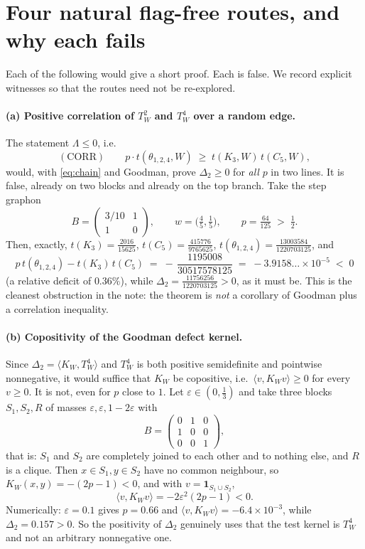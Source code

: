 \documentclass[11pt]{article}
\theoremstyle{definition}
\newcommand{\tw}{T_W}
\newcommand{\kw}{K_W}
\newcommand{\thet}{\theta_{1,2,4}}
\begin{document}
\section{Four natural flag-free routes, and why each fails}\label{sec:dead}

Each of the following would give a short proof.  Each is false.  We record
explicit witnesses so that the routes need not be re-explored.

\paragraph{(a) Positive correlation of $\tw^2$ and $\tw^4$ over a random edge.}
The statement $\Lambda\le0$, i.e.
\[
  (\mathrm{CORR})\qquad p\cdot t(\thet,W)\;\ge\;t(K_3,W)\,t(C_5,W),
\]
would, with \eqref{eq:chain} and Goodman, prove $\Delta_2\ge0$ for \emph{all}
$p$ in two lines.  It is false, already on two blocks and already on the top
branch.  Take the step graphon
\[
  B=\begin{pmatrix}3/10&1\\1&0\end{pmatrix},\qquad w=\big(\tfrac45,\tfrac15\big),
  \qquad p=\tfrac{64}{125}\;>\;\tfrac12 .
\]
Then, exactly,
$t(K_3)=\tfrac{2016}{15625}$, $t(C_5)=\tfrac{415776}{9765625}$,
$t(\thet)=\tfrac{13003584}{1220703125}$, and
\[
  p\,t(\thet)-t(K_3)\,t(C_5)\;=\;-\,\frac{1195008}{30517578125}
  \;=\;-3.9158\ldots\times10^{-5}\;<\;0
\]
(a relative deficit of $0.36\%$), while
$\Delta_2=\tfrac{11756256}{1220703125}>0$, as it must be.  This is the cleanest
obstruction in the note: the theorem is \emph{not} a corollary of Goodman plus a
correlation inequality.

\paragraph{(b) Copositivity of the Goodman defect kernel.}
Since $\Delta_2=\langle\kw,\tw^4\rangle$ and $\tw^4$ is both positive
semidefinite and pointwise nonnegative, it would suffice that $\kw$ be
copositive, i.e.\ $\langle v,\kw v\rangle\ge0$ for every $v\ge0$.  It is not,
even for $p$ close to $1$.  Let $\varepsilon\in(0,\tfrac13)$ and take three
blocks $S_1,S_2,R$ of masses $\varepsilon,\varepsilon,1-2\varepsilon$ with
\[
  B=\begin{pmatrix}0&1&0\\1&0&0\\0&0&1\end{pmatrix},
\]
that is: $S_1$ and $S_2$ are completely joined to each other and to nothing
else, and $R$ is a clique.  Then $x\in S_1,y\in S_2$ have no common neighbour,
so $\kw(x,y)=-(2p-1)<0$, and with $v=\mathbf 1_{S_1\cup S_2}$,
\[
  \langle v,\kw v\rangle=-2\varepsilon^2(2p-1)<0 .
\]
Numerically: $\varepsilon=0.1$ gives $p=0.66$ and
$\langle v,\kw v\rangle=-6.4\times10^{-3}$, while $\Delta_2=0.157>0$.  So the
positivity of $\Delta_2$ genuinely uses that the test kernel is $\tw^4$ and not
an arbitrary nonnegative one.
\end{document}
